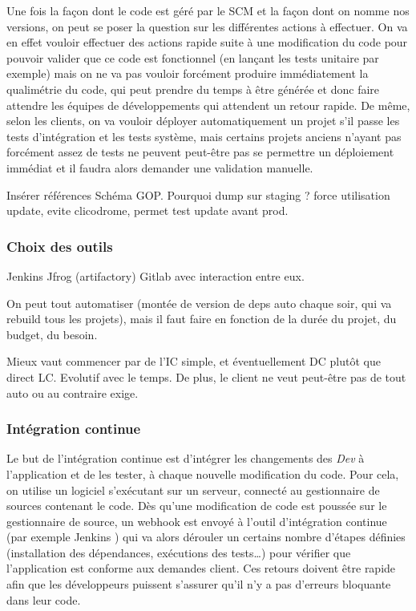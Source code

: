 Une fois la façon dont le code est géré par le \gls{SCM} et la façon dont on nomme nos versions, on peut se poser la question sur les différentes actions à effectuer. On va en effet vouloir effectuer des actions rapide suite à une modification du code pour pouvoir valider que ce code est fonctionnel (en lançant les tests unitaire par exemple) mais on ne va pas vouloir forcément produire immédiatement la qualimétrie du code, qui peut prendre du temps à être générée et donc faire attendre les équipes de développements qui attendent un retour rapide. De même, selon les clients, on va vouloir déployer automatiquement un projet s'il passe les tests d'intégration et les tests système, mais certains projets anciens n'ayant pas forcément assez de tests ne peuvent peut-être pas se permettre un déploiement immédiat et il faudra alors demander une validation manuelle.


Insérer références Schéma GOP. Pourquoi dump sur staging ? force utilisation update, evite clicodrome, permet test update avant prod.

\subsubsection{Choix des outils}


Jenkins Jfrog (artifactory) Gitlab avec interaction entre eux.

On peut tout automatiser (montée de version de deps auto chaque soir, qui va rebuild tous les projets), mais il faut faire en fonction de la durée du projet, du budget, du besoin.

Mieux vaut commencer par de l'IC simple, et éventuellement DC plutôt que direct LC. Evolutif avec le temps. De plus, le client ne veut peut-être pas de tout auto ou au contraire exige.

\subsubsection{Intégration continue}



Le but de l'intégration continue est d'intégrer les changements des \emph{Dev} à l'application et de les tester, à chaque nouvelle modification du code. Pour cela, on utilise un logiciel s'exécutant sur un serveur, connecté au gestionnaire de sources contenant le code. Dès qu'une modification de code est poussée sur le gestionnaire de source, un \gls{webhook} est envoyé à l'outil d'intégration continue (par exemple Jenkins \cite{jenkins-guide}) qui va alors dérouler un certains nombre d'étapes définies (installation des dépendances, exécutions des tests\ldots) pour vérifier que l'application est conforme aux demandes client. Ces retours doivent être rapide afin que les développeurs puissent s'assurer qu'il n'y a pas d'erreurs bloquante dans leur code.

